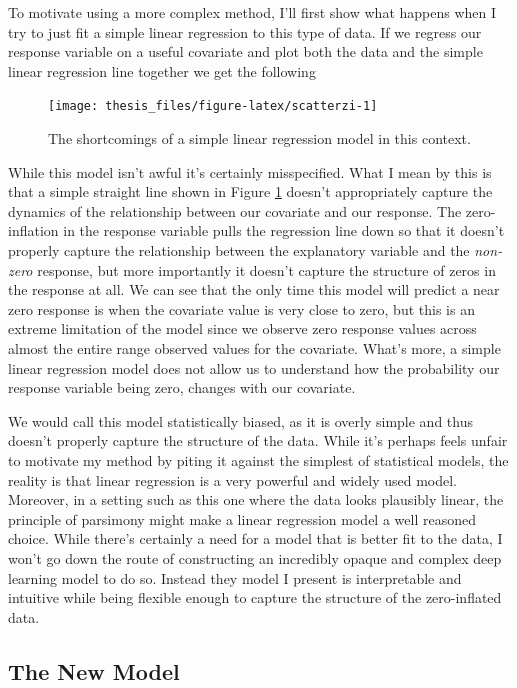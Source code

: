 \documentclass[12pt,twoside]{reedthesis}
\begin{document}
To motivate using a more complex method, I'll first show what happens when I try to just fit a simple linear regression to this type of data. If we regress our response variable on a useful covariate and plot both the data and the simple linear regression line together we get the following
\begin{figure}

{\centering \texttt{[image: thesis\_files/figure-latex/scatterzi-1]} 

}

\caption{The shortcomings of a simple linear regression model in this context.}\label{fig:scatterzi}
\end{figure}
While this model isn't awful it's certainly misspecified. What I mean by this is that a simple straight line shown in Figure \ref{fig:scatterzi} doesn't appropriately capture the dynamics of the relationship between our covariate and our response. The zero-inflation in the response variable pulls the regression line down so that it doesn't properly capture the relationship between the explanatory variable and the \emph{non-zero} response, but more importantly it doesn't capture the structure of zeros in the response at all. We can see that the only time this model will predict a near zero response is when the covariate value is very close to zero, but this is an extreme limitation of the model since we observe zero response values across almost the entire range observed values for the covariate. What's more, a simple linear regression model does not allow us to understand how the probability our response variable being zero, changes with our covariate.

We would call this model statistically biased, as it is overly simple and thus doesn't properly capture the structure of the data. While it's perhaps feels unfair to motivate my method by piting it against the simplest of statistical models, the reality is that linear regression is a very powerful and widely used model. Moreover, in a setting such as this one where the data looks plausibly linear, the principle of parsimony might make a linear regression model a well reasoned choice. While there's certainly a need for a model that is better fit to the data, I won't go down the route of constructing an incredibly opaque and complex deep learning model to do so. Instead they model I present is interpretable and intuitive while being flexible enough to capture the structure of the zero-inflated data.

\hypertarget{the-new-model}{%
\subsection{The New Model}\label{the-new-model}}
\end{document}
